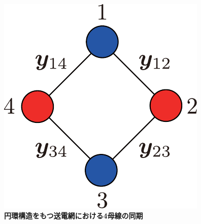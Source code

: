 \documentclass[graybox, envcountchap]{svmult}
\begin{document}

%

\begin{figure}[t]
\centering
\includegraphics[width = .20\linewidth]{figs/4busbox}
\medskip
\caption{\textbf{円環構造をもつ送電網における4母線の同期}}
\label{fig:4busbox}
\medskip
\end{figure}
\end{document}
